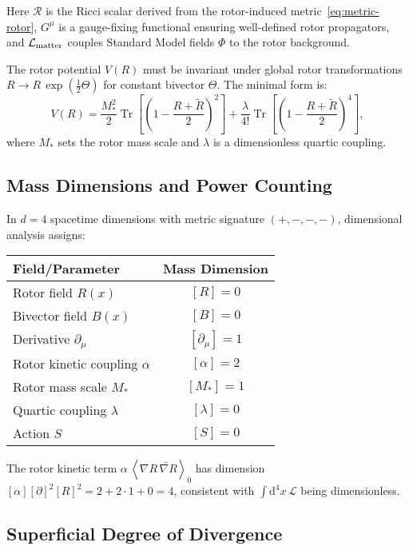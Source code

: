 \documentclass[11pt,a4paper]{article}
\numberwithin{equation}{section}
\theoremstyle{plain}
\theoremstyle{definition}
\theoremstyle{remark}
\DeclareMathOperator{\Tr}{Tr}
\newcommand{\dd}{\mathrm{d}}
\newcommand{\rev}[1]{\widetilde{#1}}        %
\newcommand{\grade}[2]{\left\langle #1 \right\rangle_{#2}}
\newcommand{\Lag}{\mathcal{L}}              %
\begin{document}
Here $\mathcal{R}$ is the Ricci scalar derived from the rotor-induced metric~\eqref{eq:metric-rotor}, $G^\mu$ is a gauge-fixing functional ensuring well-defined rotor propagators, and $\Lag_{\rm matter}$ couples Standard Model fields $\Phi$ to the rotor background.

The rotor potential $V(R)$ must be invariant under global rotor transformations $R\to R\,\exp(\tfrac12 \Theta)$ for constant bivector $\Theta$. The minimal form is:
\begin{equation}
V(R) = \frac{M_*^2}{2}\Tr\left[\left(1 - \frac{R+\rev{R}}{2}\right)^2\right] + \frac{\lambda}{4!}\Tr\left[\left(1 - \frac{R+\rev{R}}{2}\right)^4\right],
\label{eq:V-rotor}
\end{equation}
where $M_*$ sets the rotor mass scale and $\lambda$ is a dimensionless quartic coupling.

\subsection{Mass Dimensions and Power Counting}

In $d=4$ spacetime dimensions with metric signature $(+,-,-,-)$, dimensional analysis assigns:
\begin{center}
\begin{tabular}{lc}
\toprule
Field/Parameter & Mass Dimension \\
\midrule
Rotor field $R(x)$ & $[R]=0$ \\
Bivector field $B(x)$ & $[B]=0$ \\
Derivative $\partial_\mu$ & $[\partial_\mu]=1$ \\
Rotor kinetic coupling $\alpha$ & $[\alpha]=2$ \\
Rotor mass scale $M_*$ & $[M_*]=1$ \\
Quartic coupling $\lambda$ & $[\lambda]=0$ \\
Action $S$ & $[S]=0$ \\
\bottomrule
\end{tabular}
\end{center}

The rotor kinetic term $\alpha\,\grade{\nabla R\,\rev{\nabla R}}{0}$ has dimension $[\alpha][\partial]^2[R]^2 = 2+2\cdot 1 + 0 = 4$, consistent with $\int \dd^4x\,\Lag$ being dimensionless.

\subsection{Superficial Degree of Divergence}
\end{document}
